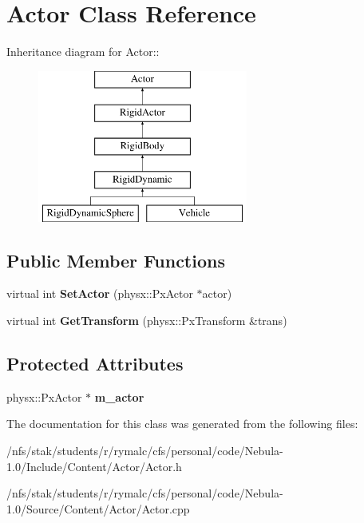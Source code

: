 \hypertarget{classActor}{
\section{Actor Class Reference}
\label{classActor}
}
Inheritance diagram for Actor::\begin{figure}[H]
\begin{center}
\leavevmode
\includegraphics[height=5cm]{classActor}
\end{center}
\end{figure}
\subsection*{Public Member Functions}
\begin{DoxyCompactItemize}
\item 
\hypertarget{classActor_a5d9f4ef38a154158f4ef98befc0649ec}{
virtual int {\bfseries SetActor} (physx::PxActor $\ast$actor)}
\label{classActor_a5d9f4ef38a154158f4ef98befc0649ec}

\item 
\hypertarget{classActor_a7597c33fee36b6a551234b1154d7fb4a}{
virtual int {\bfseries GetTransform} (physx::PxTransform \&trans)}
\label{classActor_a7597c33fee36b6a551234b1154d7fb4a}

\end{DoxyCompactItemize}
\subsection*{Protected Attributes}
\begin{DoxyCompactItemize}
\item 
\hypertarget{classActor_a7295f208d6d09a8c82fc595876931ee7}{
physx::PxActor $\ast$ {\bfseries m\_\-actor}}
\label{classActor_a7295f208d6d09a8c82fc595876931ee7}

\end{DoxyCompactItemize}


The documentation for this class was generated from the following files:\begin{DoxyCompactItemize}
\item 
/nfs/stak/students/r/rymalc/cfs/personal/code/Nebula-\/1.0/Include/Content/Actor/Actor.h\item 
/nfs/stak/students/r/rymalc/cfs/personal/code/Nebula-\/1.0/Source/Content/Actor/Actor.cpp\end{DoxyCompactItemize}
